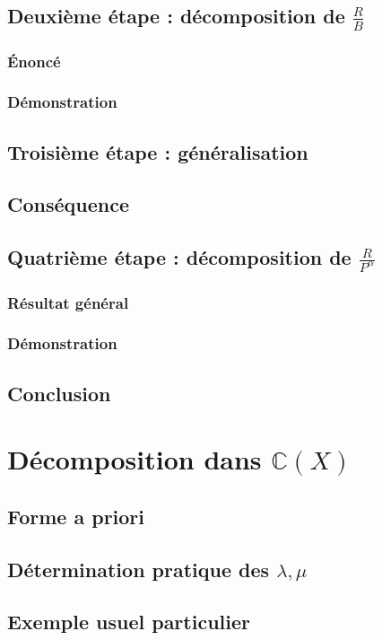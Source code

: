 \documentclass[12pt,a4paper,french]{book}
\begin{document}
		\subsection{Deuxième étape : décomposition de $\frac{R}{B}$}
			\subsubsection{Énoncé}
			\subsubsection{Démonstration}
		\subsection{Troisième étape : généralisation}
		\subsection{Conséquence}
		\subsection{Quatrième étape : décomposition de $\frac{R}{P^{\alpha}}$}
			\subsubsection{Résultat général}
			\subsubsection{Démonstration}
		\subsection{Conclusion}
	\section{Décomposition dans $\mathbb{C}(X)$}
		\subsection{Forme a priori}
		\subsection{Détermination pratique des $\lambda,\mu$}
		\subsection{Exemple usuel particulier}
\end{document}
